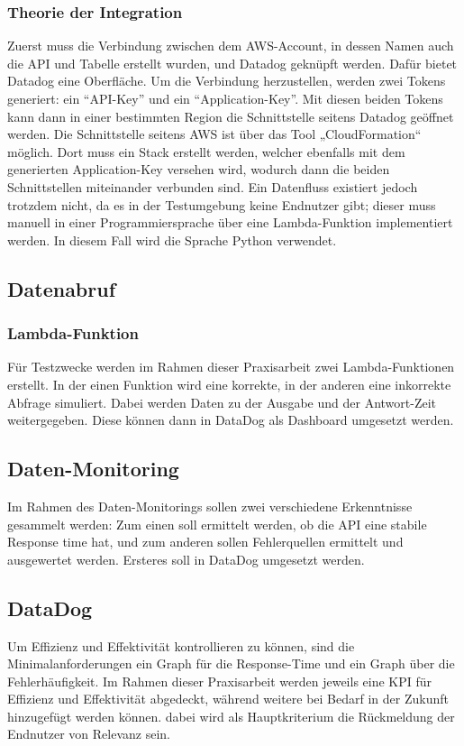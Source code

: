 \subsubsection{Theorie der Integration}
Zuerst muss die Verbindung zwischen dem AWS-Account, in dessen Namen auch die API und Tabelle erstellt wurden, und Datadog geknüpft werden. Dafür bietet Datadog eine Oberfläche. Um die Verbindung herzustellen, werden zwei Tokens generiert: ein ``API-Key'' und ein ``Application-Key''. Mit diesen beiden Tokens kann dann in einer bestimmten Region die Schnittstelle seitens Datadog geöffnet werden. Die Schnittstelle seitens AWS ist über das Tool „CloudFormation“ möglich. Dort muss ein Stack erstellt werden, welcher ebenfalls mit dem generierten Application-Key versehen wird, wodurch dann die beiden Schnittstellen miteinander verbunden sind. Ein Datenfluss existiert jedoch trotzdem nicht, da es in der Testumgebung keine Endnutzer gibt; dieser muss manuell in einer Programmiersprache über eine Lambda-Funktion implementiert werden. In diesem Fall wird die Sprache Python verwendet. 

\subsection{Datenabruf}
\subsubsection{Lambda-Funktion}
Für Testzwecke werden im Rahmen dieser Praxisarbeit zwei Lambda-Funktionen erstellt. In der einen Funktion wird eine korrekte, in der anderen eine inkorrekte Abfrage simuliert. Dabei werden Daten zu der Ausgabe und der Antwort-Zeit weitergegeben.  Diese können dann in DataDog als Dashboard umgesetzt werden. 

\subsection{Daten-Monitoring}
Im Rahmen des Daten-Monitorings sollen zwei verschiedene Erkenntnisse gesammelt werden: Zum einen soll ermittelt werden, ob die API eine stabile Response time hat, und zum anderen sollen Fehlerquellen ermittelt und ausgewertet werden. Ersteres soll in DataDog umgesetzt werden.
\subsection{DataDog}
Um Effizienz und Effektivität kontrollieren zu können, sind die Minimalanforderungen ein Graph für die Response-Time und ein Graph über die Fehlerhäufigkeit. Im Rahmen dieser Praxisarbeit werden jeweils eine KPI für Effizienz und Effektivität abgedeckt, während weitere bei Bedarf in der Zukunft hinzugefügt werden können. dabei wird als Hauptkriterium die Rückmeldung der Endnutzer von Relevanz sein. 

